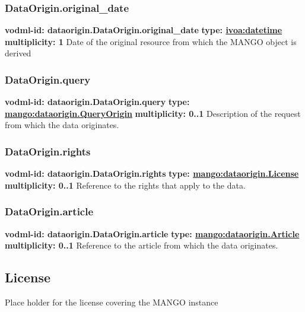     \subsubsection{DataOrigin.original\_date}
      \textbf{vodml-id: dataorigin.DataOrigin.original\_date} \newline
      \textbf{type: \hyperref[sect:ivoa]{ivoa:datetime}} \newline
      \textbf{multiplicity: 1} \newline
      Date of the original resource from which the MANGO object is derived

    \subsubsection{DataOrigin.query}
      \textbf{vodml-id: dataorigin.DataOrigin.query} \newline
      \textbf{type: \hyperref[sect:dataorigin.QueryOrigin]{mango:dataorigin.QueryOrigin}} \newline
      \textbf{multiplicity: 0..1} \newline
      Description of the request from which the data originates.

    \subsubsection{DataOrigin.rights}
      \textbf{vodml-id: dataorigin.DataOrigin.rights} \newline
      \textbf{type: \hyperref[sect:dataorigin.License]{mango:dataorigin.License}} \newline
      \textbf{multiplicity: 0..1} \newline
      Reference to the rights that apply to the data.

    \subsubsection{DataOrigin.article}
      \textbf{vodml-id: dataorigin.DataOrigin.article} \newline
      \textbf{type: \hyperref[sect:dataorigin.Article]{mango:dataorigin.Article}} \newline
      \textbf{multiplicity: 0..1} \newline
      Reference to the article from which the data originates.

  \subsection{License}
  \label{sect:dataorigin.License}
    Place holder for the license covering the MANGO instance

